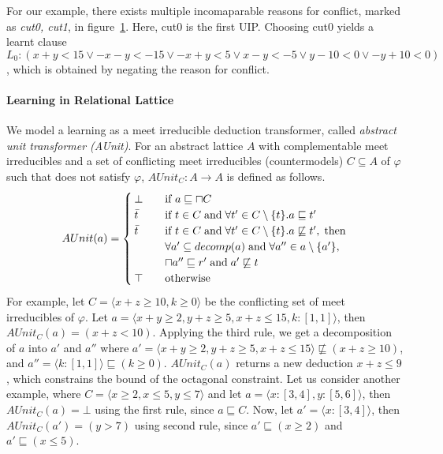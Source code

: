 For our example, there exists multiple incomaparable reasons for conflict,
marked as {\em cut0, cut1}, in figure~\ref{conflict}.  Here, cut0 is the first UIP.  
Choosing cut0 yields a learnt clause 
$L_0: (x+y<15 \vee -x-y<-15 \vee -x+y<5 \vee x-y<-5 \vee y-10<0 \vee -y+10<0)$, 
which is obtained by negating the reason for conflict.  
%
\begin{figure}
\label{conflict}
\end{figure} 
%    
\paragraph{\textbf{Learning in Relational Lattice}}
We model a learning as a meet irreducible deduction transformer, called 
{\em abstract unit transformer (AUnit)}.  For an 
abstract lattice $A$ with complementable meet irreducibles 
and a set of conflicting meet irreducibles (countermodels) 
$C \subseteq A$ of $\varphi$ such that  does not 
satisfy $\varphi$, $AUnit_C: A \rightarrow A$ is defined as follows. 
\[ AUnit(a) =
 \begin{cases}
  \bot       & \quad \text{if } a \sqsubseteq \sqcap{C} \\
  \bar{t}    & \quad \text{if } t \in C \; \text{and} \; \forall t' \in C
  \setminus \{t\}. a  \sqsubseteq t' \\
  \bar{t}    & \quad \text{if } t \in C \; \text{and} \; \forall t' \in C \setminus \{t\}. a
  \not\sqsubseteq t', \; \text{then} \\ 
             & \quad \forall a' \subseteq decomp(a) \;  \text{and} \; \forall a'' \in a \setminus \{a'\}, \\ 
             & \quad \sqcap{a''} \sqsubseteq r' \; \text{and} \; a' \not\sqsubseteq t  \\
  \top & \quad \text{otherwise} \\
 \end{cases}
\]
For example, let $C = \langle x+z \geq 10,  k \geq 0 \rangle$ be the conflicting set 
of meet irreducibles of $\varphi$.  Let $a= \langle x+y \geq 2, y+z \geq 5, x+z \leq 15, k:[1,1] \rangle$, 
then $AUnit_C(a) = (x+z < 10)$.  Applying the third rule, we get a decomposition 
of $a$ into $a'$ and $a''$ where 
$a'= \langle x+y \geq 2, y+z \geq 5, x+z \leq 15 \rangle \not\sqsubseteq (x+z \geq 10)$, and 
$a''= \langle k:[1,1] \rangle \sqsubseteq (k \geq 0)$.  $AUnit_C(a)$ returns a new 
deduction $x+z \leq 9$, which constrains the bound of the octagonal constraint.  
Let us consider another example, where $C = \langle x \geq 2, x \leq 5, y \leq 7 \rangle$
and let $a = \langle x:[3,4], y:[5,6] \rangle$, then $AUnit_C(a) = \bot$ using
the first rule, since $a \sqsubseteq C$.  Now, let $a' = \langle x:[3,4] \rangle$, 
then $AUnit_C(a') = (y > 7)$ using second rule, since $a' \sqsubseteq (x \geq 2)$
and $a' \sqsubseteq (x \leq 5)$.
 
